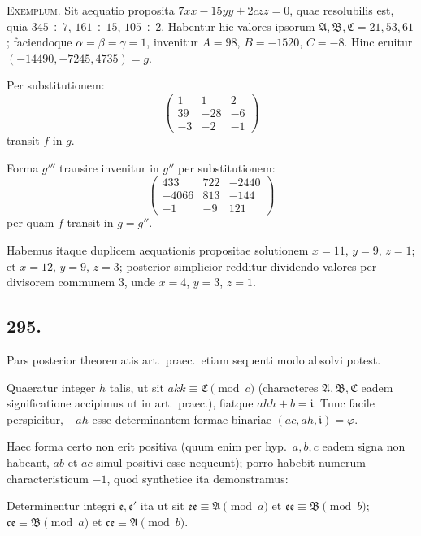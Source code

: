 \documentclass[12pt,a4paper]{article}
\theoremstyle{plain}
\theoremstyle{definition}
\theoremstyle{remark}
\begin{document}
\textsc{Exemplum.} Sit aequatio proposita $7xx - 15yy + 2czz = 0$, quae
resolubilis est, quia $345 \div 7$, $161 \div 15$, $105 \div 2$. Habentur hic valores
ipsorum $\mathfrak{A}, \mathfrak{B}, \mathfrak{C} = 21, 53, 61$; faciendoque $\alpha = \beta = \gamma = 1$, invenitur
$A = 98$, $B = -1520$, $C = -8$. Hinc eruitur $(-14490, -7245, 4735) = g$.

Per substitutionem:
\[
\begin{pmatrix}
1 & 1 & 2 \\
39 & -28 & -6 \\
-3 & -2 & -1
\end{pmatrix}
\]
transit $f$ in $g$.

Forma $g'''$ transire invenitur in $g''$ per substitutionem:
\[
\begin{pmatrix}
433 & 722 & -2440 \\
-4066 & 813 & -144 \\
-1 & -9 & 121
\end{pmatrix}
\]
per quam $f$ transit in $g = g''$.

Habemus itaque duplicem aequationis propositae solutionem $x = 11$,
$y = 9$, $z = 1$; et $x = 12$, $y = 9$, $z = 3$; posterior simplicior redditur
dividendo valores per divisorem communem $3$, unde $x = 4$, $y = 3$, $z = 1$.

\subsection*{295.}

Pars posterior theorematis art.\@~praec.\ etiam sequenti modo absolvi potest.

Quaeratur integer $h$ talis, ut sit $akk \equiv \mathfrak{C} \pmod{c}$ (characteres
$\mathfrak{A}, \mathfrak{B}, \mathfrak{C}$ eadem significatione accipimus ut in art.\@~praec.), fiatque
$ahh + b = \mathfrak{i}$. Tunc facile perspicitur, $-ah$ esse determinantem formae
binariae $(ac, ah, \mathfrak{i}) = \varphi$.

Haec forma certo non erit positiva (quum enim per hyp.\ $a, b, c$ eadem signa
non habeant, $ab$ et $ac$ simul positivi esse nequeunt); porro habebit numerum
characteristicum $-1$, quod synthetice ita demonstramus:

Determinentur integri $\mathfrak{e}, \mathfrak{e}'$ ita ut sit
$\mathfrak{e}\mathfrak{e} \equiv \mathfrak{A} \pmod{a}$ et $\mathfrak{e}\mathfrak{e} \equiv \mathfrak{B} \pmod{b}$;
$\mathfrak{c}\mathfrak{e} \equiv \mathfrak{B} \pmod{a}$ et $\mathfrak{c}\mathfrak{e} \equiv \mathfrak{A} \pmod{b}$.
\end{document}
